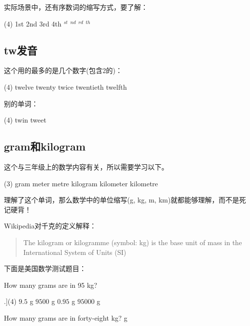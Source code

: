 \documentclass[a4paper]{article}
\begin{document}
实际场景中，还有序数词的缩写方式，要了解：

\begin{tasks}[style=enumerate](4)
 \task 1st        \task 2nd     \task 3rd   \task 4th
 $\displaystyle ^{st}$  $^{nd}$  $^{rd}$  $^{th}$
\end{tasks}

  \subsection{tw发音}
这个用的最多的是几个数字(包含2的)：

\begin{tasks}[style=enumerate](4)
 \task twelve  \task twenty  \task twice  \task twentieth \task twelfth
\end{tasks}

别的单词：

\begin{tasks}[style=enumerate](4)
 \task twin  \task tweet
\end{tasks}

  \subsection{gram和kilogram}
这个与三年级上的数学内容有关，所以需要学习以下。 

\begin{tasks}[style=enumerate](3)
 \task gram        \task meter      \task metre
 \task kilogram  \task kilometer  \task kilometre
\end{tasks}

理解了这个单词，那么数学中的单位缩写(g, kg, m, km)就都能够理解，而不是死记硬背！ 

Wikipedia对千克的定义解释：
\begin{quote}
 The {\large{kilogram}{}} or {\large{kilogramme}{}} (symbol: kg) is the base unit of mass in the International System of Units (SI)
\end{quote}

下面是美国数学测试题目：

\begin{question}
 How many grams are in 95 kg?

 \begin{tasks}[counter-format=tsk[A].](4)
 \task $9.5$ g
 \task $9500$ g
 \task $0.95$ g
 \task $95000$ g
 \end{tasks}

\end{question}
\begin{solution}
\end{solution}
\begin{question}
 How many grams are in forty-eight kg? \qquad \blank[width=2cm]{} g
\end{question}
\begin{solution}
\end{solution}
\end{document}
